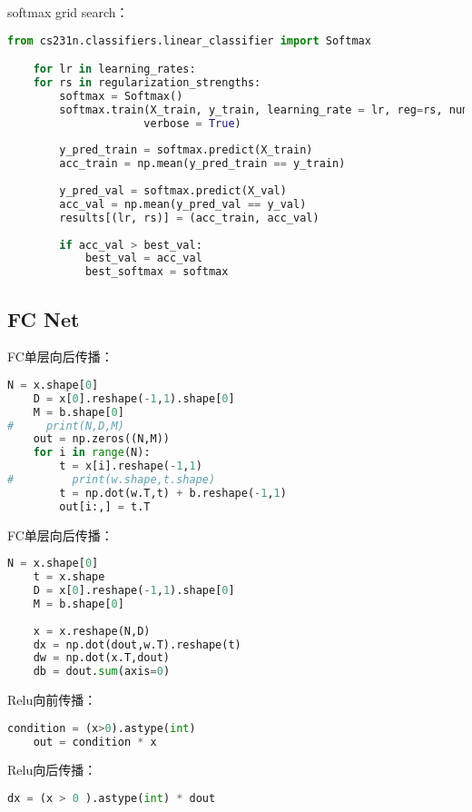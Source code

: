 \documentclass[a4paper]{article}
\begin{document}
softmax grid search：

\begin{lstlisting}[language=Python, caption=softmax grid search]
    from cs231n.classifiers.linear_classifier import Softmax

    for lr in learning_rates:
    for rs in regularization_strengths:
        softmax = Softmax()
        softmax.train(X_train, y_train, learning_rate = lr, reg=rs, num_iters = 1500,
                     verbose = True)
        
        y_pred_train = softmax.predict(X_train)
        acc_train = np.mean(y_pred_train == y_train)
        
        y_pred_val = softmax.predict(X_val)
        acc_val = np.mean(y_pred_val == y_val)
        results[(lr, rs)] = (acc_train, acc_val)
        
        if acc_val > best_val:
            best_val = acc_val
            best_softmax = softmax
\end{lstlisting}

\subsection{FC Net}
FC单层向后传播：
\begin{lstlisting}[language=Python, caption=FC单层前向传播]
    N = x.shape[0]
    D = x[0].reshape(-1,1).shape[0]
    M = b.shape[0]
#     print(N,D,M)
    out = np.zeros((N,M))
    for i in range(N):
        t = x[i].reshape(-1,1)
#         print(w.shape,t.shape)
        t = np.dot(w.T,t) + b.reshape(-1,1)
        out[i:,] = t.T
\end{lstlisting}
FC单层向后传播：
\begin{lstlisting}[language=Python, caption=FC单层向后传播]
    N = x.shape[0]
    t = x.shape
    D = x[0].reshape(-1,1).shape[0]
    M = b.shape[0]
    
    x = x.reshape(N,D)
    dx = np.dot(dout,w.T).reshape(t)
    dw = np.dot(x.T,dout)
    db = dout.sum(axis=0)
\end{lstlisting}
Relu向前传播：
\begin{lstlisting}[language=Python, caption=Relu向前传播]
    condition = (x>0).astype(int)
    out = condition * x
\end{lstlisting}
Relu向后传播：
\begin{lstlisting}[language=Python, caption=Relu向后传播]
    dx = (x > 0 ).astype(int) * dout
\end{lstlisting}
\end{document}
